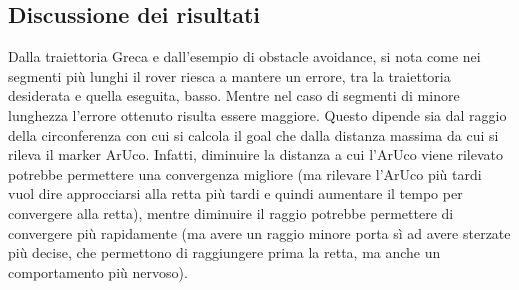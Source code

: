 \subsection{Discussione dei risultati}
Dalla traiettoria Greca e dall'esempio di obstacle avoidance, si nota come nei segmenti più lunghi il rover riesca a mantere un errore, tra la traiettoria desiderata e quella eseguita, basso. Mentre nel caso di segmenti di minore lunghezza l'errore ottenuto risulta essere maggiore. Questo dipende sia dal raggio della circonferenza con cui si calcola il goal che dalla distanza massima da cui si rileva il marker ArUco. Infatti, diminuire la distanza a cui l'ArUco viene rilevato potrebbe permettere una convergenza migliore (ma rilevare l'ArUco più tardi vuol dire approcciarsi alla retta più tardi e quindi aumentare il tempo per convergere alla retta), mentre diminuire il raggio potrebbe permettere di convergere più rapidamente (ma avere un raggio minore porta sì ad avere sterzate più decise, che permettono di raggiungere prima la retta, ma anche un comportamento più nervoso).  
